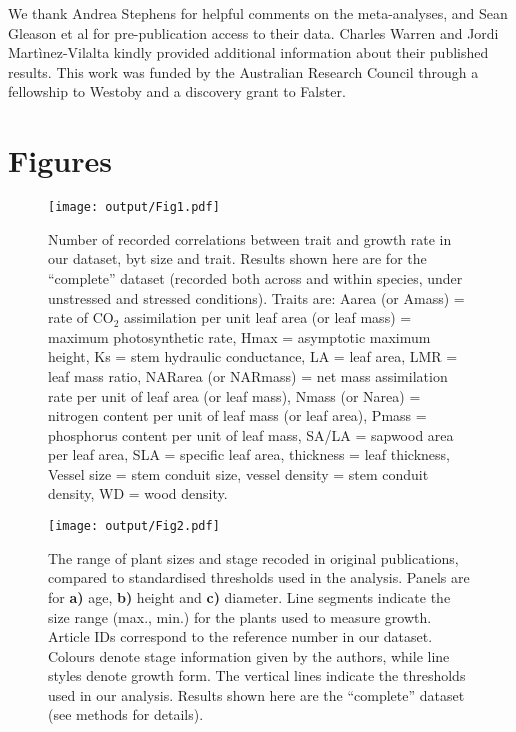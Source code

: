 \documentclass[a4paper]{article}\usepackage[]{graphicx}\usepackage[]{color}
\begin{document}
We thank Andrea Stephens for helpful comments on the meta-analyses, and Sean Gleason et al for pre-publication access to their data. Charles Warren and Jordi Martìnez-Vilalta kindly provided additional information about their published results. This work was funded by the Australian Research Council through a fellowship to Westoby and a discovery grant to Falster.

\clearpage
\linespread{1}

\nocite{*}

\label{references}


\clearpage
\section*{Figures}

\begin{figure}[h!]
\centering
\texttt{[image: output/Fig1.pdf]}
\caption{Number of recorded correlations between trait and growth rate in our dataset, byt size and trait. Results shown here are for the ``complete'' dataset (recorded both across and within species, under unstressed and stressed conditions). Traits are: Aarea (or Amass) = rate of CO$_{2}$ assimilation per unit leaf area (or leaf mass) = maximum photosynthetic rate, Hmax = asymptotic maximum height,  Ks = stem hydraulic conductance, LA = leaf area, LMR = leaf mass ratio, NARarea (or NARmass) = net mass assimilation rate per unit of leaf area (or leaf mass), Nmass (or Narea) = nitrogen content per unit of leaf mass (or leaf area), Pmass = phosphorus content per unit of leaf mass, SA/LA = sapwood area per leaf area, SLA = specific leaf area, thickness = leaf thickness, Vessel size = stem conduit size, vessel density = stem conduit density, WD = wood density.}
\label{fig:fig1}
\end{figure}

\begin{figure}[h!]
\centering
\texttt{[image: output/Fig2.pdf]}
\caption{The range of plant sizes and stage recoded in original publications, compared to standardised thresholds used in the analysis. Panels are for
\textbf{a)} age, \textbf{b)} height and \textbf{c)} diameter. Line segments indicate the size range (max., min.) for the plants used to measure growth. Article IDs correspond to the reference number in our dataset. Colours denote stage information given by the authors, while line styles denote growth form. The vertical lines indicate the thresholds used in our analysis. Results shown here are the ``complete'' dataset (see methods for details).}
\label{fig:fig2}
\end{figure}
\end{document}
